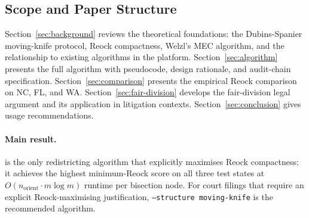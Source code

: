 \subsection{Scope and Paper Structure}

Section~\ref{sec:background} reviews the theoretical foundations: the
Dubins-Spanier moving-knife protocol, Reock compactness, Welzl's MEC
algorithm, and the relationship to existing algorithms in the platform.
Section~\ref{sec:algorithm} presents the full \mka{} algorithm with
pseudocode, design rationale, and audit-chain specification.
Section~\ref{sec:comparison} presents the empirical Reock comparison on NC,
FL, and WA.
Section~\ref{sec:fair-division} develops the fair-division legal argument
and its application in litigation contexts.
Section~\ref{sec:conclusion} gives usage recommendations.

\paragraph{Main result.}
\mka{} is the only redistricting algorithm that explicitly maximises
Reock compactness; it achieves the highest minimum-Reock score on all
three test states at $O(n_{\mathrm{orient}} \cdot m \log m)$ runtime per bisection node.
For court filings that require an explicit Reock-maximising justification,
\texttt{--structure moving-knife} is the recommended algorithm.
